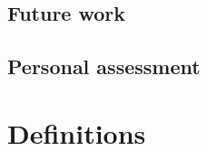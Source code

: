 \documentclass[a4paper, 12pt]{book}
\begin{document}
\section{Future work}
\label{sec:future-work}



\section{Personal assessment}
\label{sec:assessment}


\cleardoublepage



\cleardoublepage
\appendix
\chapter{Definitions}
\label{app:definitions}

\end{document}
